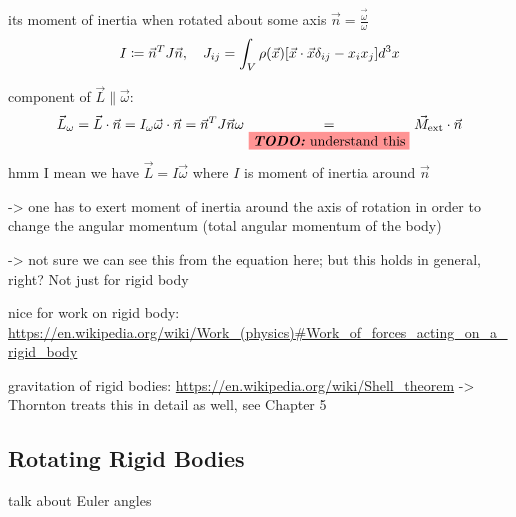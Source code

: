 \documentclass[../class_mech_main.tex]{subfiles}
\begin{document}
its moment of inertia when rotated about some axis $\vec{n} = \frac{\vec{\omega}}{\omega}$
\begin{equation}
	I \coloneqq \vec{n}^T J \vec{n}, \quad J_{ij} = \int_V \rho(\vec{x}) \qty[\vec{x} \cdot \vec{x} \delta_{ij} - x_i x_j] d^3x
\end{equation}


component of $\vec{L} \parallel \vec{\omega}$:
\begin{equation}
	\vec{L}_\omega = \vec{L} \cdot \vec{n} = I_\omega \vec{\omega} \cdot \vec{n} = \vec{n}^T J \vec{n} \omega \underset{\todo{understand this}}{=} \vec{M}_\mathrm{ext} \cdot \vec{n}
\end{equation}
hmm I mean we have $\vec{L} = I \vec{\omega}$ where $I$ is moment of inertia around $\vec{n}$

-> one has to exert moment of inertia around the axis of rotation in order to change the angular momentum (total angular momentum of the body)

-> not sure we can see this from the equation here; but this holds in general, right? Not just for rigid body




nice for work on rigid body: \url{https://en.wikipedia.org/wiki/Work_(physics)#Work_of_forces_acting_on_a_rigid_body}



gravitation of rigid bodies: \url{https://en.wikipedia.org/wiki/Shell_theorem} -> Thornton treats this in detail as well, see Chapter 5



		\subsection{Rotating Rigid Bodies}
talk about Euler angles
\end{document}
